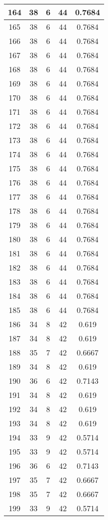 \documentclass[letterpaper, 12pt]{article}
\begin{document}
\begin{longtable}{|c|c|c|c|c|}
\hline
164 & 38 & 6 & 44 & 0.7684 \\
\hline
165 & 38 & 6 & 44 & 0.7684 \\
\hline
166 & 38 & 6 & 44 & 0.7684 \\
\hline
167 & 38 & 6 & 44 & 0.7684 \\
\hline
168 & 38 & 6 & 44 & 0.7684 \\
\hline
169 & 38 & 6 & 44 & 0.7684 \\
\hline
170 & 38 & 6 & 44 & 0.7684 \\
\hline
171 & 38 & 6 & 44 & 0.7684 \\
\hline
172 & 38 & 6 & 44 & 0.7684 \\
\hline
173 & 38 & 6 & 44 & 0.7684 \\
\hline
174 & 38 & 6 & 44 & 0.7684 \\
\hline
175 & 38 & 6 & 44 & 0.7684 \\
\hline
176 & 38 & 6 & 44 & 0.7684 \\
\hline
177 & 38 & 6 & 44 & 0.7684 \\
\hline
178 & 38 & 6 & 44 & 0.7684 \\
\hline
179 & 38 & 6 & 44 & 0.7684 \\
\hline
180 & 38 & 6 & 44 & 0.7684 \\
\hline
181 & 38 & 6 & 44 & 0.7684 \\
\hline
182 & 38 & 6 & 44 & 0.7684 \\
\hline
183 & 38 & 6 & 44 & 0.7684 \\
\hline
184 & 38 & 6 & 44 & 0.7684 \\
\hline
185 & 38 & 6 & 44 & 0.7684 \\
\hline
186 & 34 & 8 & 42 & 0.619 \\
\hline
187 & 34 & 8 & 42 & 0.619 \\
\hline
188 & 35 & 7 & 42 & 0.6667 \\
\hline
189 & 34 & 8 & 42 & 0.619 \\
\hline
190 & 36 & 6 & 42 & 0.7143 \\
\hline
191 & 34 & 8 & 42 & 0.619 \\
\hline
192 & 34 & 8 & 42 & 0.619 \\
\hline
193 & 34 & 8 & 42 & 0.619 \\
\hline
194 & 33 & 9 & 42 & 0.5714 \\
\hline
195 & 33 & 9 & 42 & 0.5714 \\
\hline
196 & 36 & 6 & 42 & 0.7143 \\
\hline
197 & 35 & 7 & 42 & 0.6667 \\
\hline
198 & 35 & 7 & 42 & 0.6667 \\
\hline
199 & 33 & 9 & 42 & 0.5714 \\
\hline
\end{longtable}
\end{document}
